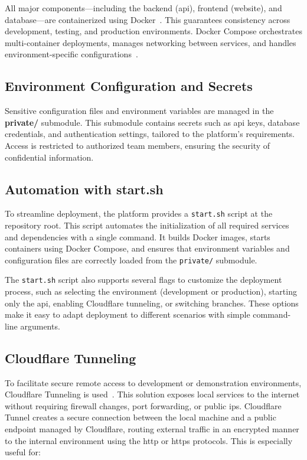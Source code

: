 All major components—including the backend (\ac{api}), frontend (website), and database—are containerized using Docker~\cite{docker-docs}. This guarantees consistency across development, testing, and production environments. Docker Compose orchestrates multi-container deployments, manages networking between services, and handles environment-specific configurations~\cite{docker-compose-docs}.

\subsection{Environment Configuration and Secrets} \label{subsec:env_config}

Sensitive configuration files and environment variables are managed in the \textbf{private/} submodule. This submodule contains secrets such as \ac{api} keys, database credentials, and authentication settings, tailored to the platform's requirements. Access is restricted to authorized team members, ensuring the security of confidential information.

\subsection{Automation with start.sh} \label{subsec:automation_startsh}

To streamline deployment, the platform provides a \texttt{start.sh} script at the repository root. This script automates the initialization of all required services and dependencies with a single command. It builds Docker images, starts containers using Docker Compose, and ensures that environment variables and configuration files are correctly loaded from the \texttt{private/} submodule.

The \texttt{start.sh} script also supports several flags to customize the deployment process, such as selecting the environment (development or production), starting only the \ac{api}, enabling Cloudflare tunneling, or switching branches. These options make it easy to adapt deployment to different scenarios with simple command-line arguments.

\subsection{Cloudflare Tunneling} \label{subsec:cloudflare_tunneling}

To facilitate secure remote access to development or demonstration environments, Cloudflare Tunneling is used~\cite{cloudflare-tunnel-docs}. This solution exposes local services to the internet without requiring firewall changes, port forwarding, or public \ac{ip}s. Cloudflare Tunnel creates a secure connection between the local machine and a public endpoint managed by Cloudflare, routing external traffic in an encrypted manner to the internal environment using the \ac{http} or \ac{https} protocols. This is especially useful for:

